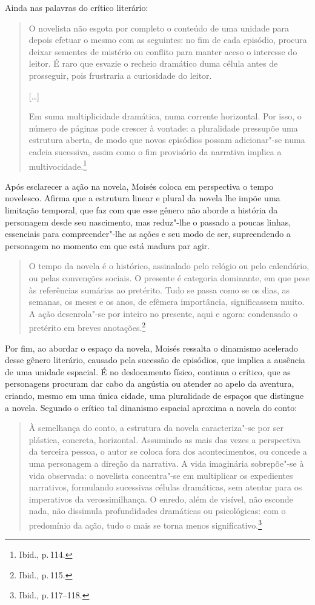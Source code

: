 Ainda nas palavras do crítico literário:

\begin{quote}
O novelista não esgota por completo o conteúdo de uma unidade para depois efetuar o mesmo com as seguintes: no fim de cada episódio, procura deixar sementes de mistério ou conflito para manter aceso o interesse do leitor. É raro que esvazie o recheio dramático duma célula antes de prosseguir, pois frustraria a curiosidade do leitor.

{[}\ldots{]}

Em suma multiplicidade dramática, numa corrente horizontal. Por isso, o número de páginas pode crescer à vontade: a pluralidade pressupõe uma estrutura aberta, de modo que novos episódios possam adicionar"-se numa cadeia sucessiva, assim como o fim provisório da narrativa implica a multivocidade.\footnote{Ibid., p.\,114.}
\end{quote}

Após esclarecer a ação na novela, Moisés coloca em perspectiva o tempo novelesco. Afirma que a estrutura linear e plural da novela lhe impõe uma limitação temporal, que faz com que esse gênero não aborde a história da personagem desde seu nascimento, mas reduz"-lhe o passado a poucas linhas, essenciais para compreender"-lhe as ações e seu modo de ser, supreendendo a personagem no momento em que está madura par agir.

\begin{quote}
O tempo da novela é o histórico, assinalado pelo relógio ou pelo calendário, ou pelas convenções sociais. O presente é categoria dominante, em que pese às referências sumárias ao pretérito. Tudo se passa como se os dias, as semanas, os meses e os anos, de efêmera importância, significassem muito. A ação desenrola"-se por inteiro no presente, aqui e agora: condensado o pretérito em breves anotações.\footnote{Ibid., p.\,115.}
\end{quote}

Por fim, ao abordar o espaço da novela, Moisés ressalta o dinamismo acelerado desse gênero literário, causado pela sucessão de episódios, que implica a ausência de uma unidade espacial. É no deslocamento físico, continua o crítico, que as personagens procuram dar cabo da angústia ou atender ao apelo da aventura, criando, mesmo em uma única cidade, uma pluralidade de espaços que distingue a novela. Segundo o crítico tal dinanismo espacial aproxima a novela do conto:

\begin{quote}
À semelhança do conto, a estrutura da novela caracteriza"-se por ser plástica, concreta, horizontal. Assumindo as mais das vezes a perspectiva da terceira pessoa, o autor se coloca fora dos acontecimentos, ou concede a uma personagem a direção da narrativa. A vida imaginária sobrepõe"-se à vida observada: o novelista concentra"-se em multiplicar os expedientes narrativos, formulando sucessivas células dramáticas, sem atentar para os imperativos da verossimilhança. O enredo, além de visível, não esconde nada, não dissimula profundidades dramáticas ou psicológicas: com o predomínio da ação, tudo o mais se torna menos significativo.\footnote{Ibid., p.\,117--118.}
\end{quote}

